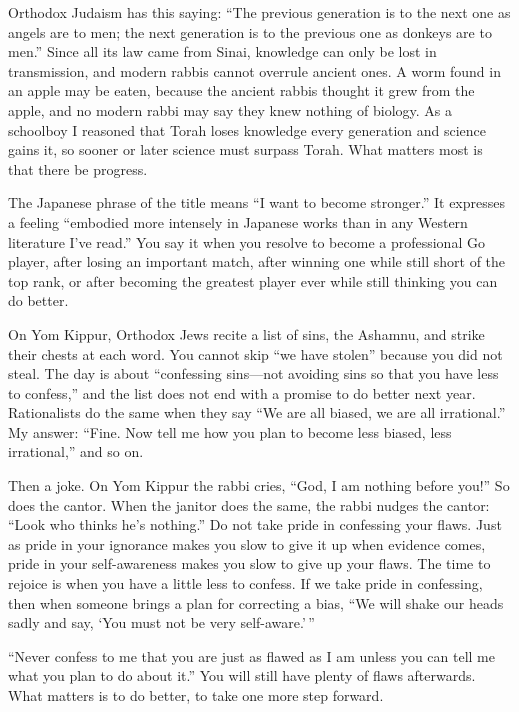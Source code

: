 
Orthodox Judaism has this saying: ``The previous generation is to the next one as angels are to men; the next generation is to the previous one as donkeys are to men.'' Since all its law came from Sinai, knowledge can only be lost in transmission, and modern rabbis cannot overrule ancient ones. A worm found in an apple may be eaten, because the ancient rabbis thought it grew from the apple, and no modern rabbi may say they knew nothing of biology. As a schoolboy I reasoned that Torah loses knowledge every generation and science gains it, so sooner or later science must surpass Torah. What matters most is that there be progress.

The Japanese phrase of the title means ``I want to become stronger.'' It expresses a feeling ``embodied more intensely in Japanese works than in any Western literature I've read.'' You say it when you resolve to become a professional Go player, after losing an important match, after winning one while still short of the top rank, or after becoming the greatest player ever while still thinking you can do better.

On Yom Kippur, Orthodox Jews recite a list of sins, the Ashamnu, and strike their chests at each word. You cannot skip ``we have stolen'' because you did not steal. The day is about ``confessing sins---not avoiding sins so that you have less to confess,'' and the list does not end with a promise to do better next year. Rationalists do the same when they say ``We are all biased, we are all irrational.'' My answer: ``Fine. Now tell me how you plan to become less biased, less irrational,'' and so on.


Then a joke. On Yom Kippur the rabbi cries, ``God, I am nothing before you!'' So does the cantor. When the janitor does the same, the rabbi nudges the cantor: ``Look who thinks he's nothing.'' Do not take pride in confessing your flaws. Just as pride in your ignorance makes you slow to give it up when evidence comes, pride in your self-awareness makes you slow to give up your flaws. The time to rejoice is when you have a little less to confess. If we take pride in confessing, then when someone brings a plan for correcting a bias, ``We will shake our heads sadly and say, `You must not be very self-aware.'\,''

``Never confess to me that you are just as flawed as I am unless you can tell me what you plan to do about it.'' You will still have plenty of flaws afterwards. What matters is to do better, to take one more step forward.
